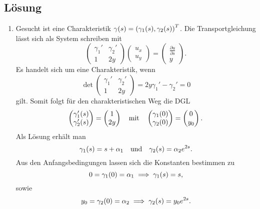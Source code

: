 \documentclass{exercise}
\begin{document}
    \subsection*{Lösung}
    \begin{enumerate}
        \item Gesucht ist eine Charakteristik \(\gamma\parentheses*{s} = \parentheses*{\gamma_1\parentheses*{s}, \gamma_2\parentheses*{s}}^T\).
        Die Transportgleichung lässt sich als System schreiben mit
        \[
            \begin{pmatrix}
                \gamma_1' & \gamma_2'\\
                1 & 2y
            \end{pmatrix}\begin{pmatrix}
                u_x\\
                u_y
            \end{pmatrix} = \begin{pmatrix}
                \frac{\partial u}{\partial s}\\
                y
            \end{pmatrix}.
        \]
        Es handelt sich um eine Charakteristik, wenn
        \[
            \det\begin{pmatrix}
                \gamma_1' & \gamma_2'\\
                1 & 2y
            \end{pmatrix} = 2y\gamma_1' - \gamma_2' = 0
        \]
        gilt.
        Somit folgt für den charakteristischen Weg die DGL
        \[
            \begin{pmatrix}
                \gamma_1'\parentheses*{s}\\
                \gamma_2'\parentheses*{s}
            \end{pmatrix} = \begin{pmatrix}
                1\\
                2y
            \end{pmatrix} \quad \text{mit} \quad \begin{pmatrix}
                \gamma_1\parentheses*{0}\\
                \gamma_2\parentheses*{0}
            \end{pmatrix} = \begin{pmatrix}
                0\\
                y_0
            \end{pmatrix}.
        \]
        Als Lösung erhält man
        \[
            \gamma_1\parentheses*{s} = s + \alpha_1 \quad \text{und} \quad \gamma_2\parentheses*{s} = \alpha_2 e^{2s}.
        \]
        Aus den Anfangsbedingungen lassen sich die Konstanten bestimmen zu
        \[
            0 = \gamma_1\parentheses*{0} = \alpha_1 \implies \gamma_1\parentheses*{s} = s,
        \]
        sowie
        \[
            y_0 = \gamma_2\parentheses*{0} = \alpha_2 \implies \gamma_2\parentheses*{s} = y_0 e^{2s}.
        \]
    \end{enumerate}
\end{document}
